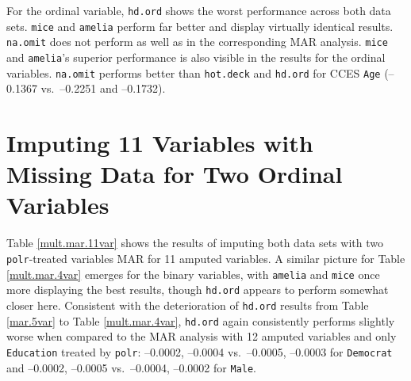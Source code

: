 \documentclass[12pt,econ]{sources/authesis}
\begin{document}
\normalsize

For the ordinal variable, \texttt{hd.ord} shows the worst performance across both data sets. \texttt{mice} and \texttt{amelia} perform far better and display virtually identical results. \texttt{na.omit} does not perform as well as in the corresponding MAR analysis. \texttt{mice} and \texttt{amelia}'s superior performance is also visible in the results for the ordinal variables. \texttt{na.omit} performs better than \texttt{hot.deck} and \texttt{hd.ord} for CCES \texttt{Age} (--0.1367 vs.~--0.2251 and --0.1732).

\hypertarget{app-ordmiss-mult-11var}{%
\section{Imputing 11 Variables with Missing Data for Two Ordinal Variables}\label{app-ordmiss-mult-11var}}

Table \ref{mult.mar.11var} shows the results of imputing both data sets with two \texttt{polr}-treated variables MAR for 11 amputed variables. A similar picture for Table \ref{mult.mar.4var} emerges for the binary variables, with \texttt{amelia} and \texttt{mice} once more displaying the best results, though \texttt{hd.ord} appears to perform somewhat closer here. Consistent with the deterioration of \texttt{hd.ord} results from Table \ref{mar.5var} to Table \ref{mult.mar.4var}, \texttt{hd.ord} again consistently performs slightly worse when compared to the MAR analysis with 12 amputed variables and only \texttt{Education} treated by \texttt{polr}: --0.0002, --0.0004 vs.~--0.0005, --0.0003 for \texttt{Democrat} and --0.0002, --0.0005 vs.~--0.0004, --0.0002 for \texttt{Male}.

\ssp
\end{document}
